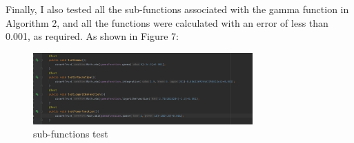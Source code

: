 \documentclass{report}
\begin{document}
\newpage
Finally, I also tested all the sub-functions associated with the gamma function in Algorithm 2, and all the functions were calculated with an error of less than 0.001, as required. As shown in Figure 7:
\begin{figure}[htbp]
\centering
\includegraphics[width=0.75\textwidth]{test_4}
\caption{sub-functions test}
\end{figure}






\end{document}
